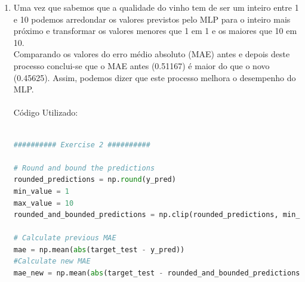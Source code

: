 \documentclass[a4paper,12pt]{article} %
\begin{document}
\begin{enumerate}
\begin{lstlisting}[language=Python]
# Training Test Split
variables_train, variables_test, target_train, target_test= train_test_split(variables, target, 
                                                                            train_size=0.8, stratify=target, random_state=0)

y_pred = np.zeros(len(target_test))

# Average the mlp regressor
for i in range(1, 11):
    # Learn the MLP regressor 
    mlp = MLPRegressor(hidden_layer_sizes=(10,10), activation='relu', early_stopping=True, validation_fraction=0.2, random_state=i)
    #Predict output
    y_pred += mlp.fit(variables_train,target_train).predict(variables_test)

y_pred = y_pred/10
first_rmse = np.sqrt(np.mean((target_test - y_pred)**2))

######### Exercise 1 ##########

# Calculate the residues
residues = abs(target_test - y_pred)
# Plot the residues

plt.hist(residues, edgecolor='darkblue', bins=20)
plt.title('Histogram of the residues')
plt.xlabel('Residues')
plt.ylabel('Frequency')
plt.savefig('ex1_histogram.png')
plt.show()
    
\end{lstlisting}

\item Uma vez que sabemos que a qualidade do vinho tem de ser um inteiro entre 
1 e 10 podemos arredondar os valores previstos pelo MLP para o inteiro mais próximo
e transformar os valores menores que 1 em 1 e os maiores que 10 em 10.\\ Comparando 
os valores do erro médio absoluto (MAE) antes e depois deste processo conclui-se 
que o MAE antes (0.51167) é maior do que o novo (0.45625). Assim, podemos dizer que 
este processo melhora o desempenho do MLP.\\ \\

Código Utilizado:

\begin{lstlisting}[language=Python]

########## Exercise 2 ##########

# Round and bound the predictions
rounded_predictions = np.round(y_pred)
min_value = 1
max_value = 10 
rounded_and_bounded_predictions = np.clip(rounded_predictions, min_value, max_value)

# Calculate previous MAE
mae = np.mean(abs(target_test - y_pred))
#Calculate new MAE
mae_new = np.mean(abs(target_test - rounded_and_bounded_predictions))


\end{lstlisting}
\end{enumerate}
\end{document}
